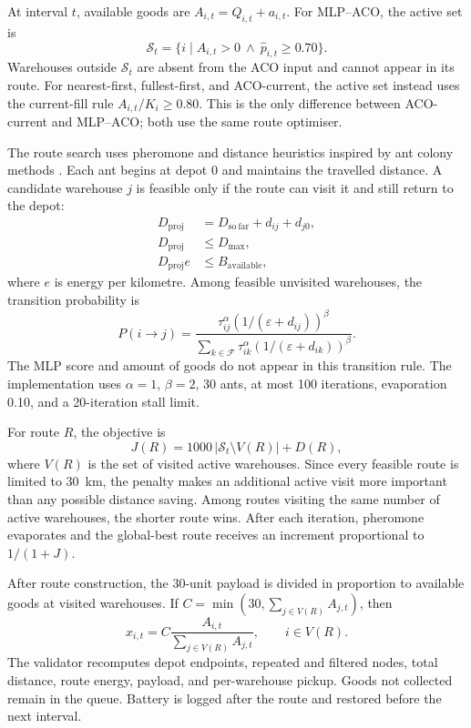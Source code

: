 \documentclass[10pt]{article}
\begin{document}
At interval $t$, available goods are $A_{i,t}=Q_{i,t}+a_{i,t}$. For MLP--ACO, the active set is
\begin{equation}
\mathcal{S}_t=\{i\mid A_{i,t}>0\ \land\ \hat p_{i,t}\geq0.70\}.
\label{eq:active-filter}
\end{equation}
Warehouses outside $\mathcal{S}_t$ are absent from the ACO input and cannot appear in its route. For nearest-first, fullest-first, and ACO-current, the active set instead uses the current-fill rule $A_{i,t}/K_i\geq0.80$. This is the only difference between ACO-current and MLP--ACO; both use the same route optimiser.

The route search uses pheromone and distance heuristics inspired by ant colony methods \citep{dorigo1997}. Each ant begins at depot 0 and maintains the travelled distance. A candidate warehouse $j$ is feasible only if the route can visit it and still return to the depot:
\begin{align}
D_{\mathrm{proj}} &= D_{\mathrm{so\ far}}+d_{ij}+d_{j0},\\
D_{\mathrm{proj}} &\leq D_{\max},\\
D_{\mathrm{proj}}e &\leq B_{\mathrm{available}},
\end{align}
where $e$ is energy per kilometre. Among feasible unvisited warehouses, the transition probability is
\begin{equation}
P(i\rightarrow j)=
\frac{\tau_{ij}^{\alpha}\left(1/(\varepsilon+d_{ij})\right)^{\beta}}
{\sum_{k\in\mathcal{F}}\tau_{ik}^{\alpha}\left(1/(\varepsilon+d_{ik})\right)^{\beta}}.
\label{eq:aco-transition}
\end{equation}
The MLP score and amount of goods do not appear in this transition rule. The implementation uses $\alpha=1$, $\beta=2$, 30 ants, at most 100 iterations, evaporation 0.10, and a 20-iteration stall limit.

For route $R$, the objective is
\begin{equation}
J(R)=1000\,|\mathcal{S}_t\setminus V(R)|+D(R),
\label{eq:aco-objective}
\end{equation}
where $V(R)$ is the set of visited active warehouses. Since every feasible route is limited to 30~km, the penalty makes an additional active visit more important than any possible distance saving. Among routes visiting the same number of active warehouses, the shorter route wins. After each iteration, pheromone evaporates and the global-best route receives an increment proportional to $1/(1+J)$.

After route construction, the 30-unit payload is divided in proportion to available goods at visited warehouses. If $C=\min(30,\sum_{j\in V(R)}A_{j,t})$, then
\begin{equation}
x_{i,t}=C\frac{A_{i,t}}{\sum_{j\in V(R)}A_{j,t}},\qquad i\in V(R).
\end{equation}
The validator recomputes depot endpoints, repeated and filtered nodes, total distance, route energy, payload, and per-warehouse pickup. Goods not collected remain in the queue. Battery is logged after the route and restored before the next interval.
\end{document}
